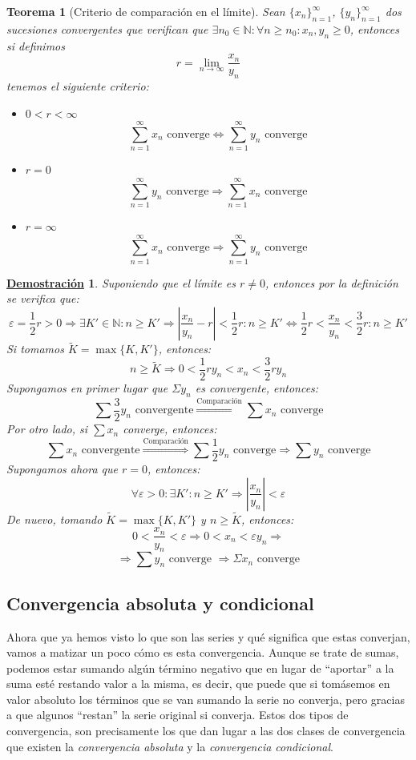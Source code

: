 \documentclass[10pt,a4paper,openright]{book}
\theoremstyle{break}
\newtheorem{theo}{Teorema}[chapter]
\newtheorem*{demo}{\underline{Demostración}}
\begin{document}
\begin{theo}[Criterio de comparación en el límite]
Sean $\{x_n\}_{n=1}^\infty$, $\{y_n\}_{n=1}^\infty$ dos sucesiones convergentes que verifican que $\exists n_0 \in \mathbb{N}: \forall n \geq n_0 : x_n , y_n \geq 0$, entonces si definimos
$$r = \lim_{n \rightarrow \infty} \frac{x_n}{y_n}$$
tenemos el siguiente criterio:
\begin{itemize}
\item $0< r <\infty$
$$\sum_{n=1}^{\infty} x_n \mbox{ converge} \Leftrightarrow \sum_{n=1}^{\infty} y_n \mbox{ converge}$$
\item $r = 0$
$$\sum_{n=1}^{\infty} y_n \mbox{ converge} \Rightarrow \sum_{n=1} ^{\infty} x_n \mbox{ converge}$$
\item $r= \infty$
$$\sum_{n=1}^{\infty} x_n \mbox{ converge} \Rightarrow \sum_{n=1} ^{\infty} y_n \mbox{ converge}$$
\end{itemize}
\end{theo}
\begin{demo}
Suponiendo que el límite es $r \neq 0$, entonces por la definición se verifica que:
$$\varepsilon = \frac{1}{2} r>0 \Rightarrow \exists K' \in \mathbb{N} : n \geq K' \Rightarrow | \frac{x_n}{y_n} - r|< \frac{1}{2} r : n \geq K' \Leftrightarrow \frac{1}{2} r <\frac{x_n}{y_n} < \frac{3}{2} r : n \geq K'$$
Si tomamos $\tilde{K} = \max \{K, K'\}$, entonces:
$$n \geq \tilde{K} \Rightarrow 0 <\frac{1}{2} r y_n < x_n < \frac{3}{2} r y_n $$
Supongamos en primer lugar que $\Sigma y_n$ es convergente, entonces:
$$\sum \frac{3}{2} y_n\mbox{ convergente} \overset{\mbox{Comparación}}{\Rightarrow} \sum x_n \mbox{ converge}$$
Por otro lado, si $\sum x_n$ converge, entonces:
$$\sum x_n\mbox{ convergente} \overset{\mbox{Comparación}}{\Rightarrow} \sum \frac{1}{2} y_n \mbox{ converge}\Rightarrow \sum y_n\mbox{ converge}$$
Supongamos ahora que $r=0$, entonces:
$$\forall \varepsilon >0: \exists K': n \geq K' \Rightarrow |\frac{x_n}{y_n}| < \varepsilon$$
De nuevo, tomando $\tilde{K} = \max \{K, K'\}$ y $n \geq \tilde{K}$, entonces:
$$0 < \frac{x_n}{y_n} < \varepsilon \Rightarrow 0 < x_n < \varepsilon y_n \Rightarrow$$
$$\Rightarrow \sum y_n \mbox{ converge }\Rightarrow \Sigma x_n \mbox{ converge}$$
\end{demo}

\subsection{Convergencia absoluta y condicional}
Ahora que ya hemos visto lo que son las series y qué significa que estas converjan, vamos a matizar un poco cómo es esta convergencia. Aunque se trate de sumas, podemos estar sumando algún término negativo que en lugar de ``aportar'' a la suma esté restando valor a la misma, es decir, que puede que si tomásemos en valor absoluto los términos que se van sumando la serie no converja, pero gracias a que algunos ``restan'' la serie original si converja. Estos dos tipos de convergencia, son precisamente los que dan lugar a las dos clases de convergencia que existen la \textit{convergencia absoluta} y la \textit{convergencia condicional}.
\end{document}
